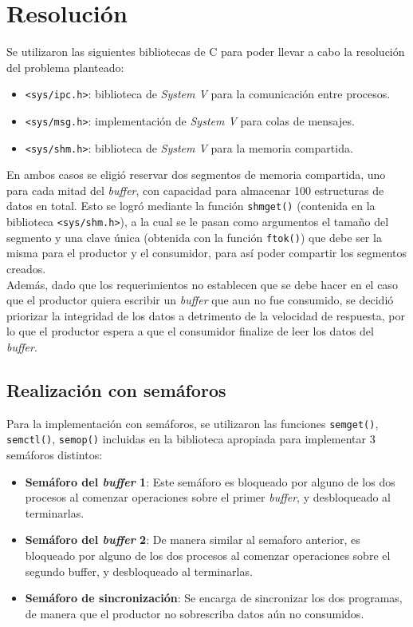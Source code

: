 \section{Resolución}

Se utilizaron las siguientes bibliotecas de C para poder llevar a cabo la resolución del problema planteado:
\begin{itemize}
    \item \texttt{<sys/ipc.h>}: biblioteca de \textit{System V} para la comunicación entre procesos.
    \item \texttt{<sys/msg.h>}: implementación de \textit{System V} para colas de mensajes.
    \item \texttt{<sys/shm.h>}: biblioteca de \textit{System V} para la memoria compartida.
\end{itemize}

En ambos casos se eligió reservar dos segmentos de memoria compartida, uno para cada mitad del \textit{buffer}, con capacidad para almacenar 100 estructuras de datos en total. Esto se logró mediante la función \texttt{shmget()} (contenida en la biblioteca \texttt{<sys/shm.h>}), a la cual se le pasan como argumentos el tamaño del segmento y una clave única (obtenida con la función \texttt{ftok()}) que debe ser la misma para el productor y el consumidor, para así poder compartir los segmentos creados.\\

Además, dado que los requerimientos no establecen que se debe hacer en el caso que el productor quiera escribir un \textit{buffer} que aun no fue consumido, se decidió priorizar la integridad de los datos a detrimento de la velocidad de respuesta, por lo que el productor espera a que el consumidor finalize de leer los datos del \textit{buffer}.\\

\subsection{Realización con semáforos}

Para la implementación con semáforos, se utilizaron las funciones \texttt{semget()}, \texttt{semctl()}, \texttt{semop()} incluidas en la biblioteca apropiada para implementar 3 semáforos distintos:

\begin{itemize}
    \item \textbf{Semáforo del \textit{buffer} 1}: Este semáforo es bloqueado por alguno de los dos procesos al comenzar operaciones sobre el primer \textit{buffer}, y desbloqueado al terminarlas.
    \item \textbf{Semáforo del \textit{buffer} 2}: De manera similar al semaforo anterior, es bloqueado por alguno de los dos procesos al comenzar operaciones sobre el segundo buffer, y desbloqueado al terminarlas.
    \item \textbf{Semáforo de sincronización}: Se encarga de sincronizar los dos programas, de manera que el productor no sobrescriba datos aún no consumidos.
\end{itemize}

